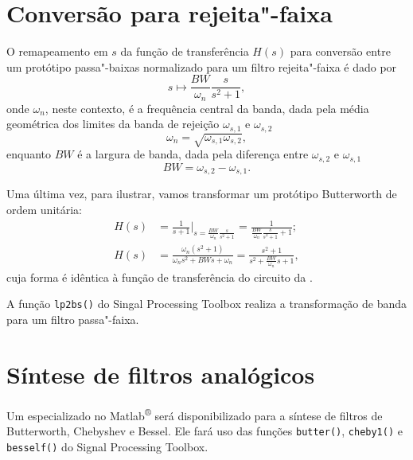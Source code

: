 \section{Conversão para rejeita"-faixa}

O remapeamento em $s$ da função de transferência $H(s)$ para conversão entre um protótipo passa"-baixas normalizado para um filtro rejeita"-faixa é dado por
\begin{equation}
	s\mapsto\frac{BW}{\omega_n}\frac{s}{s^2+1},
\end{equation}
onde $\omega_n$, neste contexto, é a frequência central da banda, dada pela média geométrica dos limites da banda de rejeição $\omega_{s,1}$ e $\omega_{s,2}$
\begin{equation}
	\omega_n=\sqrt{\omega_{s,1}\omega_{s,2}},
\end{equation}
enquanto $BW$ é a largura de banda, dada pela diferença entre $\omega_{s,2}$ e $\omega_{s,1}$
\begin{equation}
	BW=\omega_{s,2}-\omega_{s,1}.
\end{equation}

Uma última vez, para ilustrar, vamos transformar um protótipo Butterworth de ordem unitária:
\begin{align*}
	H(s)&=\frac{1}{s+1}\Bigg|_{s=\frac{BW}{\omega_n}\frac{s}{s^2+1}}=\frac{1}{\displaystyle\frac{BW}{\omega_n}\frac{s}{s^2+1}+1};\\
	H(s)&=\frac{\omega_n(s^2+1)}{\omega_ns^2+BWs+\omega_n}=\frac{s^2+1}{\displaystyle s^2+\frac{BW}{\omega_n}s+1},
\end{align*}
cuja forma é idêntica à função de transferência do circuito da .

A função \lstinline{lp2bs()} do Singal Processing Toolbox realiza a transformação de banda para um filtro passa"-faixa.

\section{Síntese de filtros analógicos}

Um  especializado no Matlab\textsuperscript{®} será disponibilizado para a síntese de filtros de Butterworth, Chebyshev e Bessel. Ele fará uso das funções \lstinline{butter()}, \lstinline{cheby1()} e \lstinline{besself()} do Signal Processing Toolbox.
